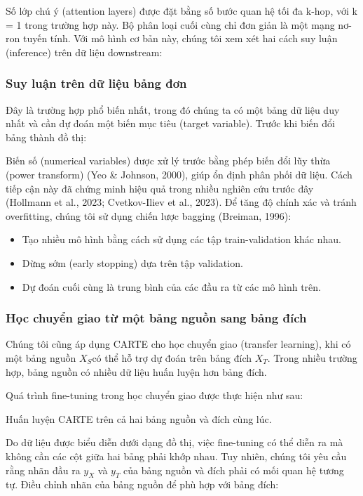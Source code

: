 \documentclass{article}
\begin{document}
Số lớp chú ý (attention layers) được đặt bằng số bước quan hệ tối đa k-hop, với k = 1 trong trường hợp này.
Bộ phân loại cuối cùng chỉ đơn giản là một mạng nơ-ron tuyến tính.
Với mô hình cơ bản này, chúng tôi xem xét hai cách suy luận (inference) trên dữ liệu downstream:

\subsubsection{Suy luận trên dữ liệu bảng đơn}
Đây là trường hợp phổ biến nhất, trong đó chúng ta có một bảng dữ liệu duy nhất và cần dự đoán một biến mục tiêu (target variable). Trước khi biến đổi bảng thành đồ thị:

Biến số (numerical variables) được xử lý trước bằng phép biến đổi lũy thừa (power transform) (Yeo \& Johnson, 2000), giúp ổn định phân phối dữ liệu. Cách tiếp cận này đã chứng minh hiệu quả trong nhiều nghiên cứu trước đây (Hollmann et al., 2023; Cvetkov-Iliev et al., 2023).
Để tăng độ chính xác và tránh overfitting, chúng tôi sử dụng chiến lược bagging (Breiman, 1996):

\begin{itemize}
    \item Tạo nhiều mô hình bằng cách sử dụng các tập train-validation khác nhau.
    \item Dừng sớm (early stopping) dựa trên tập validation.
    \item Dự đoán cuối cùng là trung bình của các đầu ra từ các mô hình trên.
\end{itemize}

\subsubsection{Học chuyển giao từ một bảng nguồn sang bảng đích}
Chúng tôi cũng áp dụng CARTE cho học chuyển giao (transfer learning), khi có một bảng nguồn $X_S$có thể hỗ trợ dự đoán trên bảng đích $X_T$. Trong nhiều trường hợp, bảng nguồn có nhiều dữ liệu huấn luyện hơn bảng đích.

Quá trình fine-tuning trong học chuyển giao được thực hiện như sau:

Huấn luyện CARTE trên cả hai bảng nguồn và đích cùng lúc.

Do dữ liệu được biểu diễn dưới dạng đồ thị, việc fine-tuning có thể diễn ra mà không cần các cột giữa hai bảng phải khớp nhau.
Tuy nhiên, chúng tôi yêu cầu rằng nhãn đầu ra $y_X$ và $y_T$ của bảng nguồn và đích phải có mối quan hệ tương tự.
Điều chỉnh nhãn của bảng nguồn để phù hợp với bảng đích:
\end{document}
